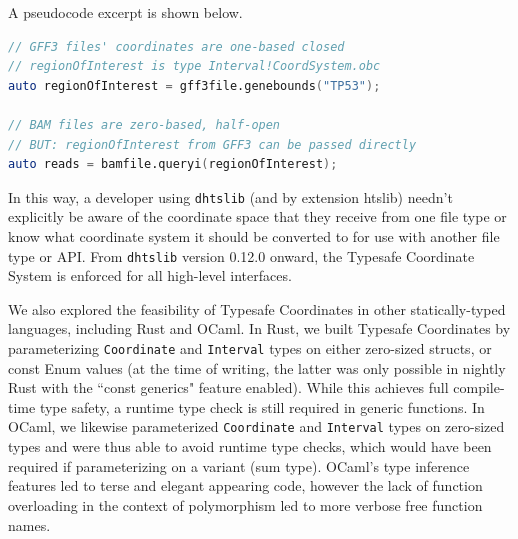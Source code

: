 \documentclass[12pt]{article}
\begin{document}
\filbreak
A pseudocode excerpt is shown below.\\

\begin{lstlisting}[language=D,frame=single,basicstyle=\ttfamily\small]
// GFF3 files' coordinates are one-based closed
// regionOfInterest is type Interval!CoordSystem.obc
auto regionOfInterest = gff3file.genebounds("TP53");

// BAM files are zero-based, half-open
// BUT: regionOfInterest from GFF3 can be passed directly
auto reads = bamfile.queryi(regionOfInterest);
\end{lstlisting}


In this way, a developer using \texttt{dhtslib} (and by extension htslib) needn't explicitly be aware of the coordinate space that they receive from one file type or know what coordinate system it should be converted to for use with another file type or API. From \texttt{dhtslib} version 0.12.0 onward, the Typesafe Coordinate System is enforced for all high-level interfaces.

We also explored the feasibility of Typesafe Coordinates in other statically-typed languages, including Rust and OCaml. In Rust, we built Typesafe Coordinates by parameterizing \texttt{Coordinate} and \texttt{Interval} types on either zero-sized structs, or const Enum values (at the time of writing, the latter was only possible in nightly Rust with the ``const generics" feature enabled). While this achieves full compile-time type safety, a runtime type check is still required in generic functions. In OCaml, we likewise parameterized \texttt{Coordinate} and \texttt{Interval} types on zero-sized types and were thus able to avoid runtime type checks, which would have been required if parameterizing on a variant (sum type). OCaml's type inference features led to terse and elegant appearing code, however the lack of function overloading in the context of polymorphism led to more verbose free function names.
\end{document}
